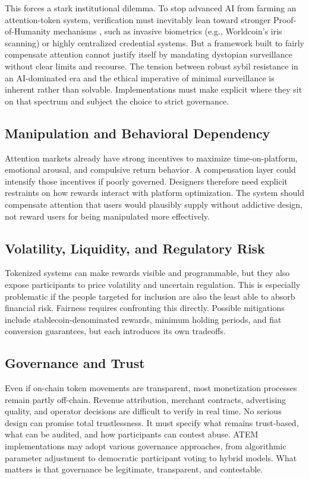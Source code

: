 \documentclass[12pt, a4paper]{article}
\begin{document}
This forces a stark institutional dilemma. To stop advanced AI from farming an attention-token system, verification must inevitably lean toward stronger Proof-of-Humanity mechanisms \citep{borge2017}, such as invasive biometrics (e.g., Worldcoin's iris scanning) or highly centralized credential systems. But a framework built to fairly compensate attention cannot justify itself by mandating dystopian surveillance without clear limits and recourse. The tension between robust sybil resistance in an AI-dominated era and the ethical imperative of minimal surveillance is inherent rather than solvable. Implementations must make explicit where they sit on that spectrum and subject the choice to strict governance.

\subsection{Manipulation and Behavioral Dependency}
\label{sec:limits-manipulation}

Attention markets already have strong incentives to maximize time-on-platform, emotional arousal, and compulsive return behavior. A compensation layer could intensify those incentives if poorly governed. Designers therefore need explicit restraints on how rewards interact with platform optimization. The system should compensate attention that users would plausibly supply without addictive design, not reward users for being manipulated more effectively.

\subsection{Volatility, Liquidity, and Regulatory Risk}
\label{sec:limits-volatility}

Tokenized systems can make rewards visible and programmable, but they also expose participants to price volatility and uncertain regulation. This is especially problematic if the people targeted for inclusion are also the least able to absorb financial risk. Fairness requires confronting this directly. Possible mitigations include stablecoin-denominated rewards, minimum holding periods, and fiat conversion guarantees, but each introduces its own tradeoffs.

\subsection{Governance and Trust}
\label{sec:limits-governance}

Even if on-chain token movements are transparent, most monetization processes remain partly off-chain. Revenue attribution, merchant contracts, advertising quality, and operator decisions are difficult to verify in real time. No serious design can promise total trustlessness. It must specify what remains trust-based, what can be audited, and how participants can contest abuse. ATEM implementations may adopt various governance approaches, from algorithmic parameter adjustment to democratic participant voting to hybrid models. What matters is that governance be legitimate, transparent, and contestable.
\end{document}
